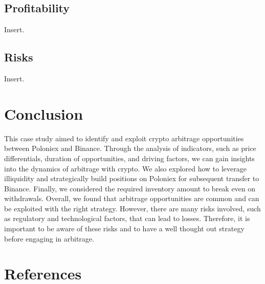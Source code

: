 \documentclass{article}
\begin{document}
\subsection{Profitability}
Insert.
\subsection{Risks}
Insert.

\section{Conclusion}
This case study aimed to identify and exploit crypto arbitrage opportunities between Poloniex and Binance. Through the analysis of indicators, such as price differentials, duration of opportunities, and driving factors, we can gain insights into the dynamics of arbitrage with crypto. We also explored how to leverage illiquidity and strategically build positions on Poloniex for subsequent transfer to Binance. Finally, we considered the required inventory amount to break even on withdrawals. Overall, we found that arbitrage opportunities are common and can be exploited with the right strategy. However, there are many risks involved, such as regulatory and technological factors, that can lead to losses. Therefore, it is important to be aware of these risks and to have a well thought out strategy before engaging in arbitrage.

\section{References}
\end{document}

